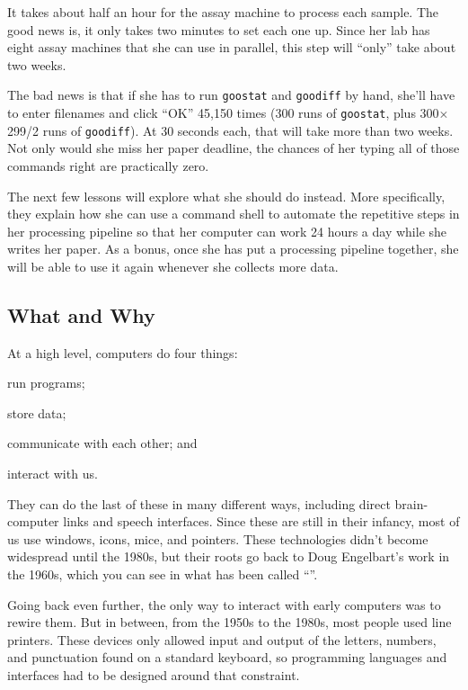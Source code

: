 It takes about half an hour for the assay machine to process each
sample. The good news is, it only takes two minutes to set each one up.
Since her lab has eight assay machines that she can use in parallel,
this step will ``only'' take about two weeks.

The bad news is that if she has to run \texttt{goostat} and
\texttt{goodiff} by hand, she'll have to enter filenames and click
``OK'' 45,150 times (300 runs of \texttt{goostat}, plus 300${\times}$299/2 runs
of \texttt{goodiff}). At 30 seconds each, that will take more than two
weeks. Not only would she miss her paper deadline, the chances of her
typing all of those commands right are practically zero.

The next few lessons will explore what she should do instead. More
specifically, they explain how she can use a command shell to automate
the repetitive steps in her processing pipeline so that her computer can
work 24 hours a day while she writes her paper. As a bonus, once she has
put a processing pipeline together, she will be able to use it again
whenever she collects more data.

\subsection*{What and Why}

At a high level, computers do four things:

\begin{swcitemize}
\item
  run programs;
\item
  store data;
\item
  communicate with each other; and
\item
  interact with us.
\end{swcitemize}

They can do the last of these in many different ways, including direct
brain-computer links and speech interfaces. Since these are still in
their infancy, most of us use windows, icons, mice, and pointers. These
technologies didn't become widespread until the 1980s, but their roots
go back to Doug Engelbart's work in the 1960s, which you can see in what
has been called ``''.

Going back even further, the only way to interact with early computers
was to rewire them. But in between, from the 1950s to the 1980s, most
people used line printers. These devices only allowed input and output
of the letters, numbers, and punctuation found on a standard keyboard,
so programming languages and interfaces had to be designed around that
constraint.

